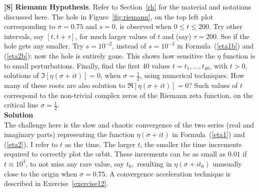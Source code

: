 \documentclass[10pt]{article}
\begin{document}
\begin{Exercise}\label{exercise11}{\bf [S]}
 {\bf Riemann Hypothesis}. Refer to Section~\ref{rh} for the material and notations discussed here. The hole in Figure~\ref{fig:riemann}, on the top left plot corresponding to $\sigma=0.75$ and $s=0$, is observed when $0\leq t \leq 200$. Try other intervals, say $[t, t+\tau]$, for much larger values of $t$ and (say) $\tau=200$. See if the hole gets any smaller. Try $s=10^{-2}$, instead of $s=10^{-3}$ in Formula~(\ref{eta1b}) and (\ref{eta2b}): now the hole is entirely gone. This shows how sensitive the $\eta$ function is to small perturbations. Finally, find the first 40 values $t=t_1,\dots,t_{40}$, with $t>0$, solutions of $\Im[\eta(\sigma+it)]=0$, when $\sigma=\frac{1}{2}$, using numerical techniques. How many of these roots are also solution to
$\Re[\eta(\sigma+it)]=0$? Such values of $t$ correspond to the non-trivial complex zeros of the Riemann zeta function, on the critical line $\sigma=\frac{1}{2}$. \vspace{1ex}   \\
{\bf Solution} \vspace{1ex}   \\
The challenge here is the slow and \textcolor{index}{chaotic convergence} of the two series (real and imaginary parts) representing the function $\eta(\sigma +it)$ in Formula~(\ref{eta1}) and (\ref{eta2}).  I refer to $t$ as the time. The larger $t$, the smaller the time increments required to correctly plot the orbit. These increments can be as small as $0.01$ if $t\approx 10^3$, to not miss any rare value, say $t_0,$ resulting in $\eta(\sigma+it_0)$ unusually close to the origin when $\sigma=0.75$.  A convergence acceleration technique is described in Exercise~\ref{exercise12}.
\end{Exercise}
\end{document}
